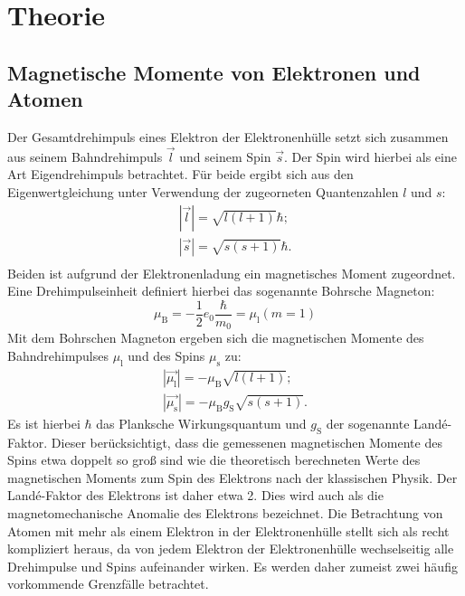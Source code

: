 \section{Theorie}
\label{sec:Theorie}
\subsection{Magnetische Momente von Elektronen und Atomen}
Der Gesamtdrehimpuls eines Elektron der Elektronenhülle setzt sich zusammen aus seinem Bahndrehimpuls $\vec{l}$ und seinem Spin $\vec{s}$.
Der Spin wird hierbei als eine Art Eigendrehimpuls betrachtet.
Für beide ergibt sich aus den Eigenwertgleichung unter Verwendung der zugeorneten Quantenzahlen $l$ und $s$:
\begin{gather}
  |\vec{l}|=\sqrt{l\left(l+1\right)}\hbar \mathrm{;}\\
  |\vec{s}|=\sqrt{s\left(s+1\right)}\hbar \mathrm{.}\\
\end{gather}
Beiden ist aufgrund der Elektronenladung ein magnetisches Moment zugeordnet.
Eine Drehimpulseinheit definiert hierbei das sogenannte Bohrsche Magneton:
\begin{equation}
  \mu_{\mathrm{B}}=-\frac{1}{2}e_0\frac{\hbar}{m_0}=\mu_{\mathrm{l}}(m=1)
\end{equation}
Mit dem Bohrschen Magneton ergeben sich die magnetischen Momente des Bahndrehimpulses $\mu_{\mathrm{l}}$ und des Spins $\mu_{\mathrm{s}}$ zu:
\begin{gather}
  |\vec{\mu_{\mathrm{l}}}|=-\mu_{\mathrm{B}}\sqrt{l\left(l+1\right)}\mathrm{;}\\
  |\vec{\mu_{\mathrm{s}}}|=-\mu_{\mathrm{B}}g_{\mathrm{S}}\sqrt{s\left(s+1\right)}\mathrm{.}
\end{gather}
Es ist hierbei $\hbar$ das Planksche Wirkungsquantum und $g_{\mathrm{S}}$ der sogenannte Landé-Faktor. Dieser berücksichtigt, dass die gemessenen magnetischen Momente des Spins
etwa doppelt so groß sind wie die theoretisch berechneten Werte des magnetischen Moments zum Spin des Elektrons nach der klassischen Physik. Der Landé-Faktor des Elektrons ist daher etwa 2. Dies wird auch als die magnetomechanische Anomalie des Elektrons bezeichnet.
Die Betrachtung von Atomen mit mehr als einem Elektron in der Elektronenhülle stellt sich als recht kompliziert heraus, da von jedem Elektron der Elektronenhülle
wechselseitig alle Drehimpulse und Spins aufeinander wirken. Es werden daher zumeist zwei häufig vorkommende Grenzfälle betrachtet.
